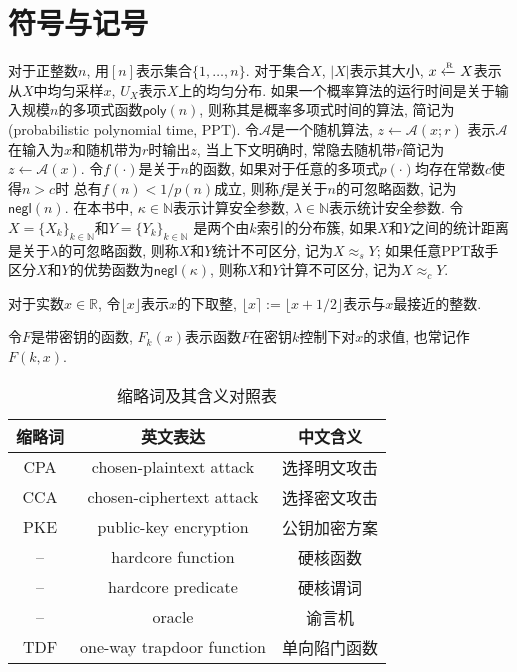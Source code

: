 \section{符号与记号}
对于正整数$n$, 用$[n]$表示集合$\{1, \dots, n\}$.
对于集合$X$, $|X|$表示其大小, $x \xleftarrow{\textup{\tiny R}} X$表示从$X$中均匀采样$x$, 
$U_X$表示$X$上的均匀分布. 
如果一个概率算法的运行时间是关于输入规模$n$的多项式函数$\mathsf{poly}(n)$, 则称其是概率多项式时间的算法, 
简记为(probabilistic polynomial time, PPT).
令$\mathcal{A}$是一个随机算法, $z \leftarrow \mathcal{A}(x;r)$
表示$\mathcal{A}$在输入为$x$和随机带为$r$时输出$z$, 当上下文明确时, 常隐去随机带$r$简记为
$z \leftarrow \mathcal{A}(x)$.  
令$f(\cdot)$是关于$n$的函数, 如果对于任意的多项式$p(\cdot)$均存在常数$c$使得$n > c$时
总有$f(n) < 1/p(n)$成立, 则称$f$是关于$n$的可忽略函数, 记为$\mathsf{negl}(n)$.  
在本书中, $\kappa \in \mathbb{N}$表示计算安全参数, $\lambda \in \mathbb{N}$表示统计安全参数. 
令$X = \{X_k\}_{k \in \mathbb{N}}$和$Y = \{Y_k\}_{k \in \mathbb{N}}$
是两个由$k$索引的分布簇, 如果$X$和$Y$之间的统计距离是关于$\lambda$的可忽略函数, 
则称$X$和$Y$统计不可区分, 记为$X \approx_s Y$; 
如果任意PPT敌手区分$X$和$Y$的优势函数为$\mathsf{negl}(\kappa)$, 则称$X$和$Y$计算不可区分, 记为$X \approx_c Y$. 


对于实数$x \in \mathbb{R}$, 令$\lfloor x \rfloor$表示$x$的下取整, 
$\lfloor x \rceil := \lfloor x + 1/2\rfloor$表示与$x$最接近的整数.

令$F$是带密钥的函数, $F_k(x)$表示函数$F$在密钥$k$控制下对$x$的求值, 也常记作$F(k, x)$.  

\begin{table}[H]
\begin{center}
\caption{缩略词及其含义对照表}
\begin{tabular}{ccc}
\hline
缩略词   & 英文表达 & 中文含义\\
\hline
CPA     & chosen-plaintext attack  		& 选择明文攻击\\
CCA     & chosen-ciphertext attack 		& 选择密文攻击\\
PKE     & public-key encryption    		& 公钥加密方案\\
--      & hardcore function        		& 硬核函数\\ 
--      & hardcore predicate       		& 硬核谓词\\  
--      & oracle                   		& 谕言机\\
TDF      & one-way trapdoor function 	& 单向陷门函数\\
\hline
\end{tabular}
\end{center}
\end{table}


